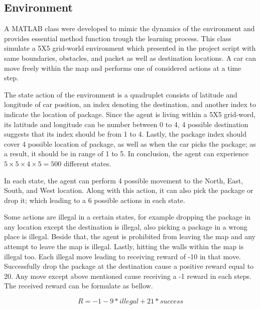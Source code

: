 \documentclass[lettersize,journal]{IEEEtran}
\begin{document}
    \subsection{Environment}
    A MATLAB class were developed to mimic the dynamics of the environment and provides essential method function trough the learning process. This class simulate a 5X5 grid-world environment which presented in the project script with same boundaries, obstacles, and packet as well as destination locations. A car can move freely within the map and performs one of considered actions at a time step. \par

    The state action of the environment is a quadruplet consists of latitude and longitude of car position, an index denoting the destination, and another index to indicate the location of package. Since the agent is living within a 5X5 grid-word, its latitude and longitude can be number between 0 to 4, 4 possible destination suggests that its index should be from 1 to 4. Lastly, the package index should cover 4 possible location of package, as well as when the car picks the package; as a result, it should be in range of 1 to 5. In conclusion, the agent can experience $5 \times 5 \times 4 \times 5 = 500$ different states.\par

    In each state, the agent can perform 4 possible movement to the North, East, South, and West location. Along with this action, it can also pick the package or drop it; which leading to a 6 possible actions in each state.\par

    Some actions are illegal in a certain states, for example dropping the package in any location except the destination is illegal, also picking a package in a wrong place is illegal. Beside that, the agent is prohibited from leaving the map and any attempt to leave the map is illegal. Lastly, hitting the walls within the map is illegal too. Each illegal move leading to receiving reward of -10 in that move. Successfully drop the package at the destination cause a positive reward equal to 20. Any move except above mentioned cause receiving a -1 reward in each steps. The received reward can be formulate as bellow.\par
    
    \begin{equation}
    R = -1 - 9*illegal + 21 * success
    \end{equation}
    
\end{document}
